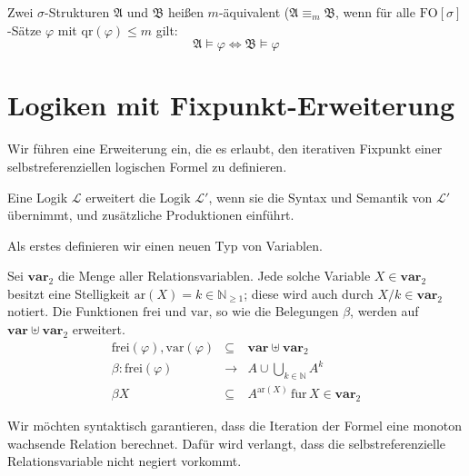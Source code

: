 \begin{defn}
\label{def:m-equiv}Zwei $\sigma$-Strukturen $\mathfrak{A}$ und
$\mathfrak{B}$ heißen $m$-äquivalent ($\mathfrak{A}\equiv_{m}\mathfrak{B}$,
wenn für alle $\mathrm{FO}\left[\sigma\right]$-Sätze $\varphi$ mit
$\mathrm{qr}\left(\varphi\right)\leqslant m$ gilt:
\[
\mathfrak{A}\models\varphi\Longleftrightarrow\mathfrak{B}\models\varphi
\]
\end{defn}

\section{Logiken mit Fixpunkt-Erweiterung}

Wir führen eine Erweiterung ein, die es erlaubt, den iterativen Fixpunkt
einer selbstreferenziellen logischen Formel zu definieren.
\begin{defn}
Eine Logik $\mathcal{L}$ erweitert die Logik $\mathcal{L}'$, wenn
sie die Syntax und Semantik von $\mathcal{L}'$ übernimmt, und zusätzliche
Produktionen einführt.
\end{defn}
Als erstes definieren wir einen neuen Typ von Variablen.
\begin{defn}
Sei $\mathbf{var}_{2}$ die Menge aller Relationsvariablen. Jede solche
Variable $X\in\mathbf{var}_{2}$ besitzt eine Stelligkeit $\mathrm{ar}\left(X\right)=k\in\mathbb{N}_{\geqslant1}$;
diese wird auch durch $X/k\in\mathbf{var}_{2}$ notiert. Die Funktionen
$\mathrm{frei}$ und $\mathrm{var}$, so wie die Belegungen $\beta$,
werden auf $\mathbf{var}\uplus\mathbf{var}_{2}$ erweitert.
\begin{eqnarray*}
\mathrm{frei}\left(\varphi\right),\mathrm{var}\left(\varphi\right) & \subseteq & \mathbf{var}\uplus\mathbf{var}_{2}\\
\beta:\mathrm{frei}\left(\varphi\right) & \rightarrow & A\cup\bigcup_{k\in\mathbb{N}}A^{k}\\
\beta X & \subseteq & A^{\mathrm{ar}\left(X\right)}\,\mathrm{f\ddot{u}r}\,X\in\mathbf{var}_{2}
\end{eqnarray*}
\end{defn}
Wir möchten syntaktisch garantieren, dass die Iteration der Formel
eine monoton wachsende Relation berechnet. Dafür wird verlangt, dass
die selbstreferenzielle Relationsvariable nicht negiert vorkommt.
